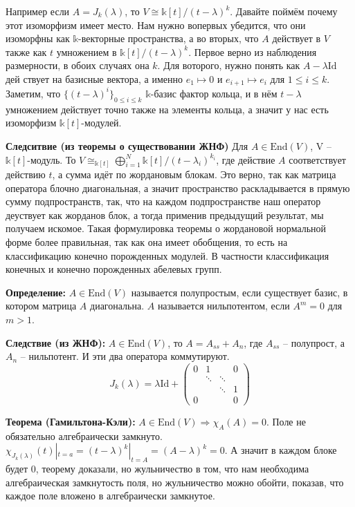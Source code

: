 \documentclass[a4paper, 12pt]{book}
\begin{document}
Например если $A=J_k(\lambda)$, то $V\cong\mathbb{k}[t]/(t-\lambda)^k$. Давайте
поймём почему этот изоморфизм имеет место. Нам нужно вопервых убедится, что они
изоморфны как $\mathbb{k}$-векторные пространства, а во вторых, что $A$
действует в $V$ также как $t$ умножением в $\mathbb{k}[t]/(t-\lambda)^k$. Первое
верно из наблюдения размерности, в обоих случаях она $k$. Для воторого, нужно
понять как $A-\lambda\text{Id}$ дей ствует на базисные вектора, а именно $e_1
\mapsto 0$ и $e_{i+1}\mapsto e_i$ для $1\leq i \le k$. Заметим, что
$\{(t-\lambda)^i\}_{0\leq i\le k}$ $\mathbb{k}$-базис фактор кольца, и в нём
$t-\lambda$ умножением действует точно также на элементы кольца, а значит у нас
есть изоморфизм $\mathbb{k}[t]$-модулей.

\textbf{Следситвие (из теоремы о существовании ЖНФ)}
Для $A\in\text{End}(V)$, V – $\mathbb{k}[t]$-модуль. То $V\cong_{\mathbb{k}[t]}
\bigoplus_{i=1}^N\mathbb{k}[t]/(t-\lambda_i)^{k_i}$, где действие $A$
соответствует действию $t$, а сумма идёт по жордановым блокам. Это верно, так
как матрица оператора блочно диагональная, а значит пространство раскладывается
в прямую сумму подпространств, так, что на каждом подпространстве наш оператор
деуствует как жорданов блок, а тогда применив предыдущий результат, мы получаем
искомое. Такая формулировка теоремы о жордановой нормальной форме более
правильная, так как она имеет обобщения, то есть на классификацию конечно
порожденных модулей. В частности классификация конечных и конечно порожденных
абелевых групп.

\textbf{Определение:} $A\in\text{End}(V)$ называется полупростым, если
существует базис, в котором матрица $A$ диагональна. $A$ называется
нильпотентом, если $A^m=0$ для $m>1$.

\textbf{Следствие (из ЖНФ):} $A\in\text{End}(V)$, то $A=A_{ss}+A_n$, где
$A_{ss}$ – полупрост, а $A_n$ – нильпотент. И эти два оператора коммутируют.
\[J_k(\lambda)=\lambda\text{Id}+\left(\begin{array}{cccc}
    0 & 1      &        & 0\\
      & \ddots & \ddots &  \\
      &        & \ddots & 1\\
    0 &        &        & 0
    \end{array}\right)\]

\textbf{Теорема (Гамильтона-Кэли):}
 $A\in\text{End}(V)\Rightarrow\chi_A(A)=0$. Поле не обязательно алгебраически
 замкнуто. $\chi_{J_k(\lambda)}(t)|_{t=a}=(t-\lambda)^k|_{t=A}=(A-\lambda)^k=0$.
 А значит в каждом блоке будет 0, теорему доказали, но жульничество в том, что
 нам необходима алгебраическая замкнутость поля, но жульничество можно обойти,
 показав, что каждое поле вложено в алгебраически замкнутое. 
\end{document}
